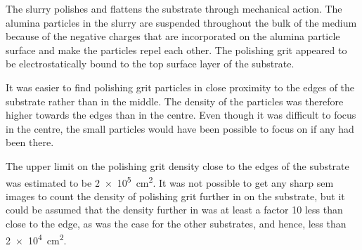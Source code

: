 The slurry polishes and flattens the substrate through mechanical action. The alumina particles in the slurry are suspended throughout the bulk of the medium because of the negative charges that are incorporated on the alumina particle surface and make the particles repel each other. The polishing grit appeared to be electrostatically bound to the top surface layer of the substrate.

It was easier to find polishing grit particles in close proximity to the edges of the substrate rather than in the middle. The density of the particles was therefore higher towards the edges than in the centre. Even though it was difficult to focus in the centre, the small particles would have been possible to focus on if any had been there.

The upper limit on the polishing grit density close to the edges of the substrate was estimated to be \SI{2e5}{\centi\metre^{2}}. It was not possible to get any sharp \ac{sem} images to count the density of polishing grit further in on the substrate, but it could be assumed that the density further in was at least a factor 10 less than close to the edge, as was the case for the other substrates, and hence, less than \SI{2e4}{\centi\metre^{2}}.

\begin{comment}

    \begin{subfigure}[t]{\textwidth}
        \caption{}\label{fig:subAa_large-grit}
          \begin{minipage}[c]{0.43\linewidth}
            \centering
            \texttt{[image: substrateA\_a1\_m016.jpg]}
          \end{minipage}
          \hfill
          \begin{minipage}[c]{0.43\linewidth}
            \centering
            \texttt{[image: eds\_subA\_SiO2.jpg]}
          \end{minipage}
          \begin{minipage}[c]{0.11\linewidth}
            \centering
            \atomicTable[&][&][&]
          \end{minipage}
    \end{subfigure}
    \par\bigskip
\subsubsection{Silicon Carbide (\ce{SiC}) and Silica (SiO2)}
A particle with a diameter of \SI{200}{\nano\metre} is shown in Fig.~\ref{fig:subAa_large-grit} with the corresponding \ac{eds} spectrum. This particle was considerably larger and had a rougher surface than the more frequently observed \SI{50}{\nano\metre} particles that were found to be residual polishing grit. The \ac{eds} spectrum of the particle revealed that the particle consisted of \ce{Si}, \ce{C}, and \ce{O}, which indicated that this particle could be residual \ce{SIO2} polishing grit, \ce{SiC} polishing grit, or an agglomeration of both. \todo{Finn atomprosent for å avgjøre. SiC eller SiO2? Hvor kommer C fra hvis bare SiO2?}
\end{comment}

